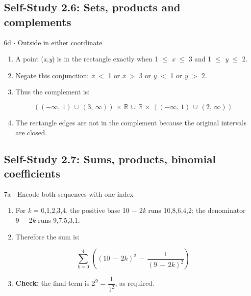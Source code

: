 \documentclass[11pt]{article}
\begin{document}
\begin{keepsection}\subsection{Self-Study 2.6: Sets, products and complements}

\begin{workedbox}{6d \ensuremath{\cdot} Outside in either coordinate}
\begin{enumerate}
\item A point (\textit{x},\textit{y}) is in the rectangle exactly when 1 \ensuremath{\leq} \textit{x} \ensuremath{\leq} 3 and 1 \ensuremath{\leq} \textit{y} \ensuremath{\leq} 2.
\item Negate this conjunction: \textit{x} \ensuremath{<} 1 or \textit{x} \ensuremath{>} 3 or \textit{y} \ensuremath{<} 1 or \textit{y} \ensuremath{>} 2.
\item {}
Thus the complement is:

\begin{equation*}((-\infty ,\, 1)\, \cup \, (3,\, \infty ))\, \times \, \mathbb{R}\, \cup \, \mathbb{R}\, \times \, ((-\infty ,\, 1)\, \cup \, (2,\, \infty ))\end{equation*}
\item The rectangle edges are not in the complement because the original intervals are closed.
\end{enumerate}
\end{workedbox}

\end{keepsection}
\begin{keepsection}\subsection{Self-Study 2.7: Sums, products, binomial coefficients}

\begin{workedbox}{7a \ensuremath{\cdot} Encode both sequences with one index}
\begin{enumerate}
\item For \textit{k} = 0,1,2,3,4, the positive base 10 \ensuremath{-} 2\textit{k} runs 10,8,6,4,2; the denominator 9 \ensuremath{-} 2\textit{k} runs 9,7,5,3,1.
\item {}
Therefore the sum is:

\begin{equation*}\sum_{{k}=0}^{4} \, \left((10\, -\, 2{k})^{2}\, -\, \dfrac{1}{(9\, -\, 2{k})^{2}}\right)\end{equation*}
\item \textbf{Check:} the final term is 2\textsuperscript{2} \ensuremath{-} {\small\ensuremath{\dfrac{1}{1^{2}}}}, as required.
\end{enumerate}
\end{workedbox}

\end{keepsection}
\end{document}
